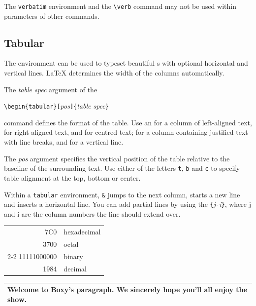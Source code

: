 The \texttt{verbatim} environment and the \verb|\verb| command may not be used
within parameters of other commands.


\subsection{Tabular}

\newcommand{\mfr}[1]{\framebox{\rule{0pt}{0.7em}\texttt{#1}}}

The  environment can be used to typeset beautiful
s with optional horizontal and vertical lines. \LaTeX{}
determines the width of the columns automatically.

The \emph{table spec} argument of the 
\begin{lscommand}
\verb|\begin{tabular}[|\emph{pos}\verb|]{|\emph{table spec}\verb|}|
\end{lscommand} 
\noindent command defines the format of the table. Use an \mfr{l} for a column of
left-aligned text, \mfr{r} for right-aligned text, and \mfr{c} for
centred text; \mfr{p\{\emph{width}\}} for a column containing justified
text with line breaks, and \mfr{|} for a vertical line.

The \emph{pos} argument specifies the vertical position of the table
relative to the baseline of the surrounding text.  Use either of the
letters \texttt{t}, \texttt{b} and \texttt{c} to specify table
alignment at the top, bottom or center.
 
Within a \texttt{tabular} environment, \texttt{\&} jumps to the next
column, \ci{\bs} starts a new line and  inserts a horizontal
line.  You can add partial lines by using the \texttt{\{}\emph{j}\texttt{-}\emph{i}\texttt{\}},
where j and i are the column numbers the line should extend over.


\begin{example}
\begin{tabular}{|r|l|}
\hline
7C0 & hexadecimal \\
3700 & octal \\ \cline{2-2}
11111000000 & binary \\
\hline \hline
1984 & decimal \\
\hline
\end{tabular}
\end{example}

\begin{example}
\begin{tabular}{|p{4.7cm}|}
\hline
Welcome to Boxy's paragraph.
We sincerely hope you'll 
all enjoy the show.\\
\hline 
\end{tabular}
\end{example}

